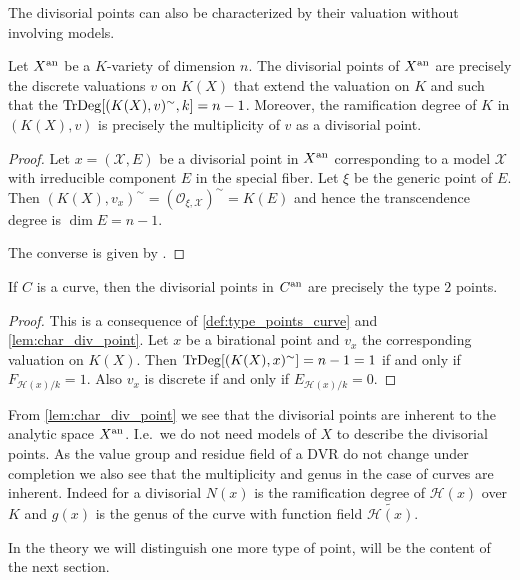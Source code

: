 The divisorial points can also be characterized by their valuation without involving models. 
\begin{lemma}\label{lem:char_div_point}
	Let $X{}^{\text{an}}$ be a $K$-variety of dimension $n$. 
	The divisorial points of $X{}^{\text{an}}$ are precisely the discrete valuations $v$ on $K(X)$ that extend the valuation on $K$ and such that the $\operatorname{TrDeg} [(K(X),v)^{\sim}, k] = n-1$.
	Moreover, the ramification degree of $K$ in $(K(X), v)$ is precisely the multiplicity of $v$ as a divisorial point.  
\end{lemma}
\begin{proof}
	Let $x = (\mathscr X, E)$ be a divisorial point in $X{}^{\text{an}}$ corresponding to a model $\mathscr X$ with irreducible component $E$ in the special fiber.
	Let $\xi$ be the generic point of $E$. 
	Then $(K(X), v_x)^{\sim} = (\mathcal{O}_{\xi, \mathscr X})^{\sim} = K(E)$ and hence the transcendence degree is $\dim E = n-1$.

	The converse is given by \cite[lem 2.45]{kollarBirationalGeometryAlgebraic1998}. 
\end{proof}

\begin{remark}
	 If $C$ is a curve, then the divisorial points in $C{}^{\text{an}}$ are precisely the type $2$ points. 
\end{remark}
\begin{proof}
	This is a consequence of \cref{def:type_points_curve} and \cref{lem:char_div_point}.
	Let $x$ be a birational point and $v_x$ the corresponding valuation on $K(X)$.
	Then $\operatorname{TrDeg}[(K(X),x)^{\sim} ] = n-1 = 1 $ if and only if $F_{\mathcal{H} (x) / k} = 1$.
	Also $v_x$ is discrete if and only if $E_{\mathcal{H} (x) / k}= 0$. 
\end{proof}


\begin{remark}
	From \cref{lem:char_div_point} we see that the divisorial points are inherent to the analytic space $X{}^{\text{an}}$. 
	I.e.\ we do not need models of $X$ to describe the divisorial points. 
	As the value group and residue field of a DVR do not change under completion we also see that the multiplicity and genus in the case of curves are inherent. 
	Indeed for a divisorial $N(x)$ is the ramification degree of $\mathcal{H} (x)$ over $K$ and $g(x)$ is the genus of the curve with function field $\widetilde{\mathcal{H} (x)}$. 
\end{remark}

In the theory we will distinguish one more type of point, will be the content of the next section.
